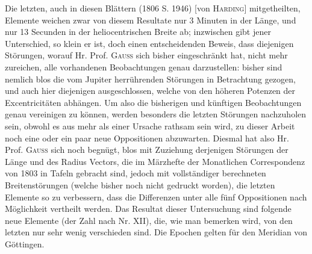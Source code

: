 \par\indent Die letzten, auch in diesen Blättern (1806 S. 1946) [von \textsc{Harding}] mitgetheilten,
Elemente weichen zwar von diesem Resultate nur 3 Minuten in der Länge, und nur 13 Secunden in der
heliocentrischen Breite ab; inzwischen gibt jener Unterschied, so klein er ist, doch einen
entscheidenden Beweis, dass diejenigen Störungen, worauf Hr. Prof. \textsc{Gauss} sich bisher
eingeschränkt hat, nicht mehr zureichen, alle vorhandenen Beobachtungen genau darzustellen:
bisher sind nemlich blos die vom Jupiter herrührenden Störungen in Betrachtung gezogen, und auch
hier diejenigen ausgeschlossen, welche von den höheren Potenzen der Excentricitäten abhängen. Um
also die bisherigen und künftigen Beobachtungen genau vereinigen zu können, werden besonders die
letzten Störungen nachzuholen sein, obwohl es aus mehr als einer Ursache rathsam sein wird, zu
dieser Arbeit noch eine oder ein paar neue Oppositionen abzuwarten. Diesmal hat also Hr. Prof.
\textsc{Gauss} sich noch begnügt, blos mit Zuziehung derjenigen Störungen der Länge und des
Radius Vectors, die im Märzhefte der Monatlichen Correspondenz von 1803 in Tafeln gebracht sind,
jedoch mit vollständiger berechneten Breitenstörungen (welche bisher noch nicht gedruckt worden),
die letzten Elemente so zu verbessern, dass die Differenzen unter alle fünf Oppositionen nach
Möglichkeit vertheilt werden. Das Resultat dieser Untersuchung sind folgende neue Elemente (der
Zahl nach Nr. XII), die, wie man bemerken wird, von den letzten nur sehr wenig verschieden sind.
Die Epochen gelten für den Meridian von Göttingen.

